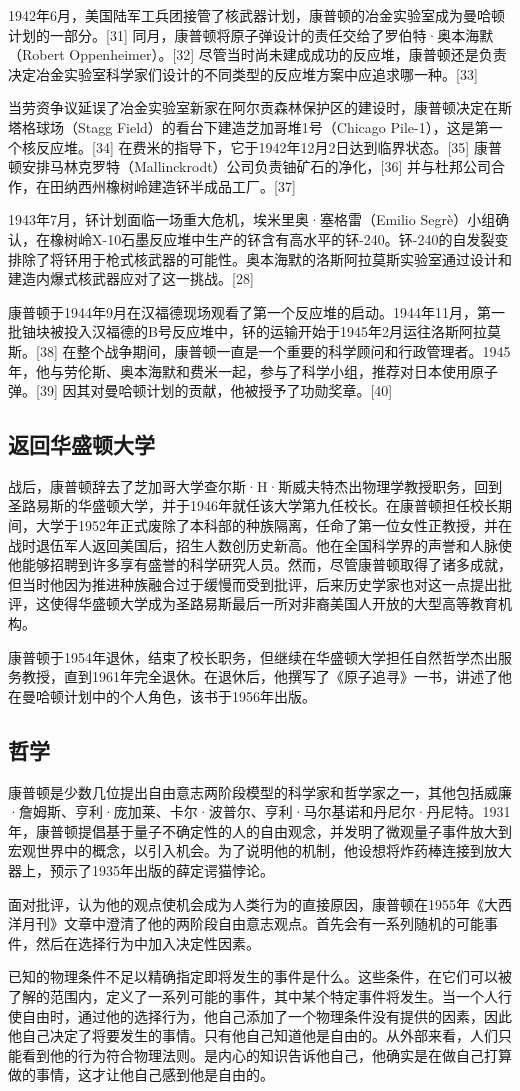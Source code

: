 1942年6月，美国陆军工兵团接管了核武器计划，康普顿的冶金实验室成为曼哈顿计划的一部分。[31] 同月，康普顿将原子弹设计的责任交给了罗伯特·奥本海默（Robert Oppenheimer）。[32] 尽管当时尚未建成成功的反应堆，康普顿还是负责决定冶金实验室科学家们设计的不同类型的反应堆方案中应追求哪一种。[33]

当劳资争议延误了冶金实验室新家在阿尔贡森林保护区的建设时，康普顿决定在斯塔格球场（Stagg Field）的看台下建造芝加哥堆1号（Chicago Pile-1），这是第一个核反应堆。[34] 在费米的指导下，它于1942年12月2日达到临界状态。[35] 康普顿安排马林克罗特（Mallinckrodt）公司负责铀矿石的净化，[36] 并与杜邦公司合作，在田纳西州橡树岭建造钚半成品工厂。[37]

1943年7月，钚计划面临一场重大危机，埃米里奥·塞格雷（Emilio Segrè）小组确认，在橡树岭X-10石墨反应堆中生产的钚含有高水平的钚-240。钚-240的自发裂变排除了将钚用于枪式核武器的可能性。奥本海默的洛斯阿拉莫斯实验室通过设计和建造内爆式核武器应对了这一挑战。[28]

康普顿于1944年9月在汉福德现场观看了第一个反应堆的启动。1944年11月，第一批铀块被投入汉福德的B号反应堆中，钚的运输开始于1945年2月运往洛斯阿拉莫斯。[38] 在整个战争期间，康普顿一直是一个重要的科学顾问和行政管理者。1945年，他与劳伦斯、奥本海默和费米一起，参与了科学小组，推荐对日本使用原子弹。[39] 因其对曼哈顿计划的贡献，他被授予了功勋奖章。[40]
\subsection{返回华盛顿大学}
战后，康普顿辞去了芝加哥大学查尔斯·H·斯威夫特杰出物理学教授职务，回到圣路易斯的华盛顿大学，并于1946年就任该大学第九任校长。在康普顿担任校长期间，大学于1952年正式废除了本科部的种族隔离，任命了第一位女性正教授，并在战时退伍军人返回美国后，招生人数创历史新高。他在全国科学界的声誉和人脉使他能够招聘到许多享有盛誉的科学研究人员。然而，尽管康普顿取得了诸多成就，但当时他因为推进种族融合过于缓慢而受到批评，后来历史学家也对这一点提出批评，这使得华盛顿大学成为圣路易斯最后一所对非裔美国人开放的大型高等教育机构。

康普顿于1954年退休，结束了校长职务，但继续在华盛顿大学担任自然哲学杰出服务教授，直到1961年完全退休。在退休后，他撰写了《原子追寻》一书，讲述了他在曼哈顿计划中的个人角色，该书于1956年出版。
\subsection{哲学}
康普顿是少数几位提出自由意志两阶段模型的科学家和哲学家之一，其他包括威廉·詹姆斯、亨利·庞加莱、卡尔·波普尔、亨利·马尔基诺和丹尼尔·丹尼特。1931年，康普顿提倡基于量子不确定性的人的自由观念，并发明了微观量子事件放大到宏观世界中的概念，以引入机会。为了说明他的机制，他设想将炸药棒连接到放大器上，预示了1935年出版的薛定谔猫悖论。

面对批评，认为他的观点使机会成为人类行为的直接原因，康普顿在1955年《大西洋月刊》文章中澄清了他的两阶段自由意志观点。首先会有一系列随机的可能事件，然后在选择行为中加入决定性因素。

已知的物理条件不足以精确指定即将发生的事件是什么。这些条件，在它们可以被了解的范围内，定义了一系列可能的事件，其中某个特定事件将发生。当一个人行使自由时，通过他的选择行为，他自己添加了一个物理条件没有提供的因素，因此他自己决定了将要发生的事情。只有他自己知道他是自由的。从外部来看，人们只能看到他的行为符合物理法则。是内心的知识告诉他自己，他确实是在做自己打算做的事情，这才让他自己感到他是自由的。